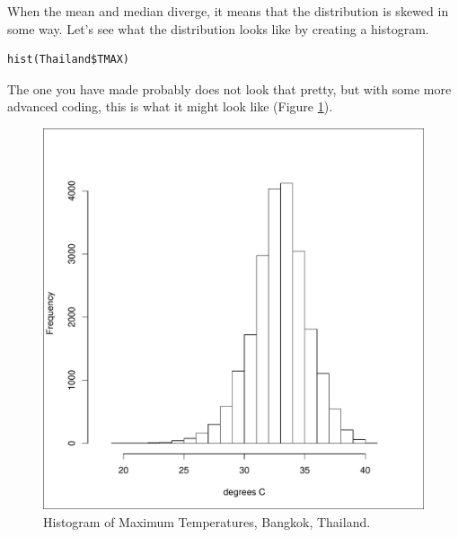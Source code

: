 \documentclass{article}\usepackage[]{graphicx}\usepackage[]{color}
\makeatletter
\def\maxwidth{ %
  \ifdim\Gin@nat@width>\linewidth
    \linewidth
  \else
    \Gin@nat@width
  \fi
}
\newenvironment{knitrout}{}{} %
\makeatother
\begin{document}
When the mean and median diverge, it means that the distribution is skewed in some way. Let's see what the distribution looks like by creating a histogram.

\begin{verbatim}
hist(Thailand$TMAX)
\end{verbatim}

The one you have made probably does not look that pretty, but with some more advanced coding, this is what it might look like (Figure \ref{fig:histogram}). 

\begin{figure}[h]%
\begin{center}

\begin{knitrout}
\color{fgcolor}
\includegraphics[width=\maxwidth]{figure/fig:histogram-1} 

\end{knitrout}
\caption{Histogram of Maximum Temperatures, Bangkok, Thailand.}
\label{fig:histogram}
\end{center}
\end{figure}
\end{document}
